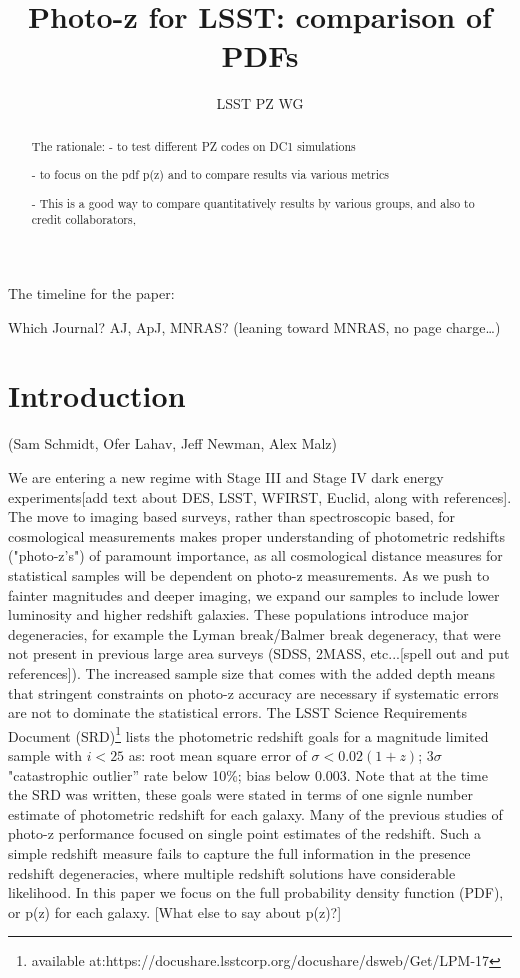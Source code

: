 \documentclass[usenatbib]{mn2e}
\title{Photo-z for LSST: comparison of PDFs}
\author{LSST PZ WG}
\begin{document}
\maketitle

\begin{abstract}
The rationale: - to test different PZ codes on DC1 simulations 

- to focus on the pdf p(z) and to compare results via various metrics

- This is a good way to compare quantitatively results by various groups, and also to credit collaborators, 
\end{abstract}

The timeline for the paper:

Which Journal? AJ, ApJ, MNRAS? (leaning toward MNRAS, no page charge…) 

\section{Introduction}

(Sam Schmidt, Ofer Lahav, Jeff Newman, Alex Malz)

We are entering a new regime with Stage III and Stage IV dark energy experiments[add text about DES, LSST, WFIRST, Euclid, along with references].  The move to imaging based surveys, rather than spectroscopic based, for cosmological measurements makes proper understanding of photometric redshifts ("photo-z's") of paramount importance, as all cosmological distance measures for statistical samples will be dependent on photo-z measurements.  As we push to fainter magnitudes and deeper imaging, we expand our samples to include lower luminosity and higher redshift galaxies.  These populations introduce major degeneracies, for example the Lyman break/Balmer break degeneracy, that were not present in previous large area surveys (SDSS, 2MASS, etc...[spell out and put references]).  The increased sample size that comes with the added depth means that stringent constraints on photo-z accuracy are necessary if systematic errors are not to dominate the statistical errors.  The LSST Science Requirements Document (SRD)\footnote{available at:https://docushare.lsstcorp.org/docushare/dsweb/Get/LPM-17} lists the photometric redshift goals for a magnitude limited sample with $i<25$ as: root mean square error of $\sigma<0.02(1+z)$; $3\sigma$ "catastrophic outlier'' rate below 10\%; bias below 0.003.  Note that at the time the SRD was written, these goals were stated in terms of one signle number estimate of photometric redshift for each galaxy.  Many of the previous studies of photo-z performance focused on single point estimates of the redshift.  Such a simple redshift measure fails to capture the full information in the presence redshift degeneracies, where multiple redshift solutions have considerable likelihood.  In this paper we focus on the full probability density function (PDF), or p(z) for each galaxy.  [What else to say about p(z)?]
\end{document}

